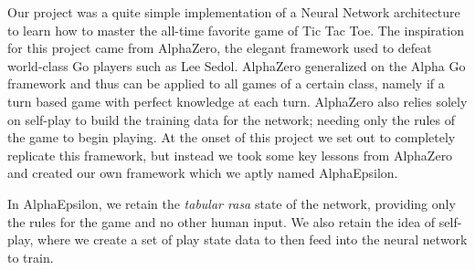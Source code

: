 

Our project was a quite simple implementation of a Neural Network architecture to learn how to master the all-time favorite game of Tic Tac Toe.
The inspiration for this project came from AlphaZero, the elegant framework used to defeat world-class Go players such as Lee Sedol.
AlphaZero generalized on the Alpha Go framework and thus can be applied to all games of a certain class, namely if a turn based game with perfect knowledge at each turn.
AlphaZero also relies solely on self-play to build the training data for the network;
needing only the rules of the game to begin playing.
At the onset of this project we set out to completely replicate this framework, but instead we took some key lessons from AlphaZero and created our own framework which we aptly named AlphaEpsilon.

In AlphaEpsilon, we retain the \textit{tabular rasa} state of the network, providing only the rules for the game and no other human input.
We also retain the idea of self-play, where we create a set of play state data to then feed into the neural network to train.
